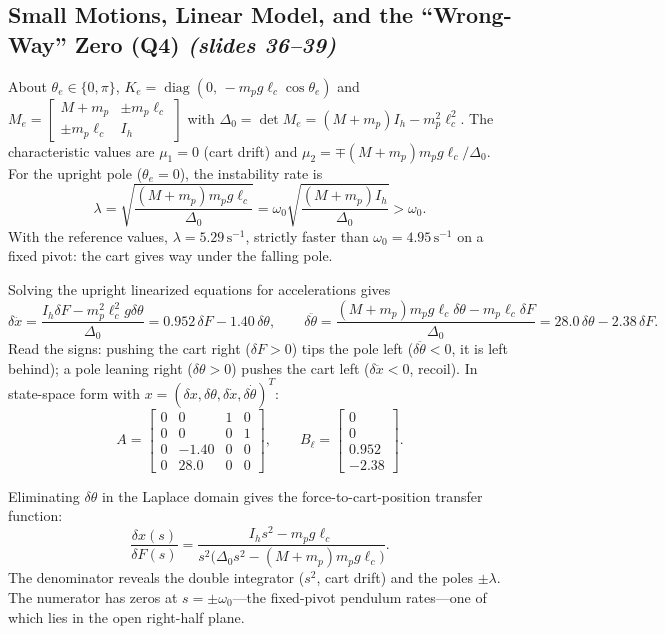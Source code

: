\documentclass[11pt, a4paper]{article}
\theoremstyle{definition}
\theoremstyle{plain}
\begin{document}
\subsection{Small Motions, Linear Model, and the ``Wrong-Way'' Zero (Q4) \emph{(slides 36--39)}}

About $\theta_e \in \{0, \pi\}$, $K_e = \operatorname{diag}(0,\, -m_p g \ell_c \cos\theta_e)$ and $M_e = \begin{bmatrix} M+m_p & \pm m_p \ell_c \\ \pm m_p \ell_c & I_h \end{bmatrix}$ with $\Delta_0 = \det M_e = (M+m_p)I_h - m_p^2 \ell_c^2$. The characteristic values are $\mu_1 = 0$ (cart drift) and $\mu_2 = \mp (M+m_p)m_p g \ell_c / \Delta_0$. For the upright pole ($\theta_e = 0$), the instability rate is
\[
  \lambda = \sqrt{\frac{(M + m_p) m_p g \ell_c}{\Delta_0}} = \omega_0 \sqrt{\frac{(M + m_p) I_h}{\Delta_0}} > \omega_0.
\]
With the reference values, $\lambda = 5.29\,\mathrm{s}^{-1}$, strictly faster than $\omega_0 = 4.95\,\mathrm{s}^{-1}$ on a fixed pivot: the cart gives way under the falling pole.

Solving the upright linearized equations for accelerations gives
\[
  \delta\ddot{x} = \frac{I_h \delta F - m_p^2 \ell_c^2 g \delta\theta}{\Delta_0} = 0.952\,\delta F - 1.40\,\delta\theta, \qquad
  \delta\ddot{\theta} = \frac{(M+m_p)m_p g \ell_c \delta\theta - m_p \ell_c \delta F}{\Delta_0} = 28.0\,\delta\theta - 2.38\,\delta F.
\]
Read the signs: pushing the cart right ($\delta F > 0$) tips the pole left ($\delta\ddot{\theta} < 0$, it is left behind); a pole leaning right ($\delta\theta > 0$) pushes the cart left ($\delta\ddot{x} < 0$, recoil). In state-space form with $x = (\delta x, \delta\theta, \delta\dot{x}, \delta\dot{\theta})^T$:
\[
  A = \begin{bmatrix} 0 & 0 & 1 & 0 \\ 0 & 0 & 0 & 1 \\ 0 & -1.40 & 0 & 0 \\ 0 & 28.0 & 0 & 0 \end{bmatrix}, \qquad
  B_\ell = \begin{bmatrix} 0 \\ 0 \\ 0.952 \\ -2.38 \end{bmatrix}.
\]

Eliminating $\delta\theta$ in the Laplace domain gives the force-to-cart-position transfer function:
\[
  \frac{\delta x(s)}{\delta F(s)} = \frac{I_h s^2 - m_p g \ell_c}{s^2 \big(\Delta_0 s^2 - (M + m_p) m_p g \ell_c\big)}.
\]
The denominator reveals the double integrator ($s^2$, cart drift) and the poles $\pm\lambda$. The numerator has zeros at $s = \pm\omega_0$---the fixed-pivot pendulum rates---one of which lies in the open right-half plane.
\end{document}
